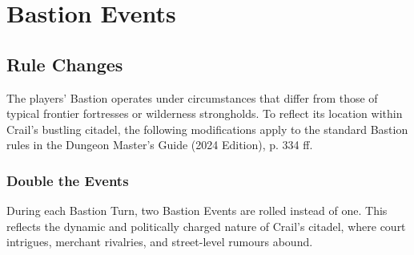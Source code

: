 \chapter*{Bastion Events}\label{chapter:BastionEvents}
\section*{Rule Changes}
{\entryfont The players' Bastion operates under circumstances that differ from those of typical frontier fortresses or wilderness strongholds. To reflect its location within Crail's bustling citadel, the following modifications apply to the standard Bastion rules in the Dungeon Master's Guide (2024 Edition), p. 334 ff.}
\subsection*{Double the Events}
{\entryfont During each Bastion Turn, two Bastion Events are rolled instead of one. This reflects the dynamic and politically charged nature of Crail's citadel, where court intrigues, merchant rivalries, and street-level rumours abound.}
